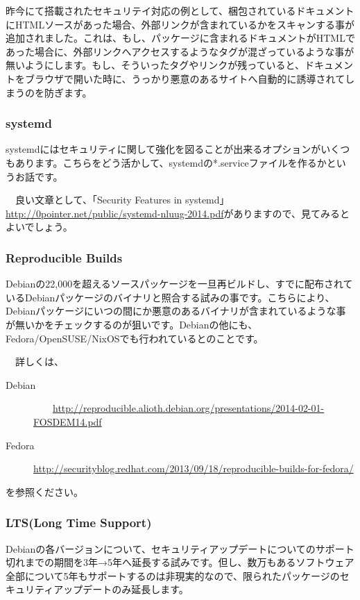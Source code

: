 \documentclass[mingoth,a4paper]{jsarticle}
\begin{document}
 昨今にて搭載されたセキュリテイ対応の例として、梱包されているドキュメントにHTMLソースがあった場合、外部リンクが含まれているかをスキャンする事が追加されました。これは、もし、パッケージに含まれるドキュメントがHTMLであった場合に、外部リンクへアクセスするようなタグが混ざっているような事が無いようにします。もし、そういったタグやリンクが残っていると、ドキュメントをブラウザで開いた時に、うっかり悪意のあるサイトへ自動的に誘導されてしまうのを防ぎます。

\subsubsection{systemd}

 systemdにはセキュリティに関して強化を図ることが出来るオプションがいくつもあります。こちらをどう活かして、systemdの*.serviceファイルを作るかというお話です。
 
　良い文章として、「Security Features in systemd」\url{http://0pointer.net/public/systemd-nluug-2014.pdf}がありますので、見てみるとよいでしょう。

\subsubsection{Reproducible Builds}

 Debianの22,000を超えるソースパッケージを一旦再ビルドし、すでに配布されているDebianパッケージのバイナリと照合する試みの事です。こちらにより、Debianパッケージにいつの間にか悪意のあるバイナリが含まれているような事が無いかをチェックするのが狙いです。Debianの他にも、Fedora/OpenSUSE/NixOSでも行われているとのことです。

　詳しくは、
 \begin{description}
\item [Debian]
　　\url{http://reproducible.alioth.debian.org/presentations/2014-02-01-FOSDEM14.pdf}

\item [Fedora]
   \url{http://securityblog.redhat.com/2013/09/18/reproducible-builds-for-fedora/}
 \end{description}

を参照ください。
   
\subsubsection{LTS(Long Time Support)}

Debianの各バージョンについて、セキュリティアップデートについてのサポート切れまでの期間を3年→5年へ延長する試みです。但し、数万もあるソフトウェア全部について5年もサポートするのは非現実的なので、限られたパッケージのセキュリティアップデートのみ延長します。
\end{document}
